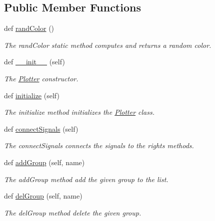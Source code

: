 \subsection*{Public Member Functions}
\begin{DoxyCompactItemize}
\item 
def \hyperlink{classDQN-Deepmind-NIPS-2013_1_1Plotter_1_1Plotter_a781363a311a4b659f454b9f10a930fe5}{rand\+Color} ()
\begin{DoxyCompactList}\small\item\em The rand\+Color static method computes and returns a random color. \end{DoxyCompactList}\item 
def \hyperlink{classDQN-Deepmind-NIPS-2013_1_1Plotter_1_1Plotter_a667c98c2620e83ae62d8cd9a9ba4e94c}{\+\_\+\+\_\+init\+\_\+\+\_\+} (self)
\begin{DoxyCompactList}\small\item\em The \hyperlink{classDQN-Deepmind-NIPS-2013_1_1Plotter_1_1Plotter}{Plotter} constructor. \end{DoxyCompactList}\item 
def \hyperlink{classDQN-Deepmind-NIPS-2013_1_1Plotter_1_1Plotter_a8e1227cf851a49de8362084fe06846fa}{initialize} (self)
\begin{DoxyCompactList}\small\item\em The initialize method initializes the \hyperlink{classDQN-Deepmind-NIPS-2013_1_1Plotter_1_1Plotter}{Plotter} class. \end{DoxyCompactList}\item 
def \hyperlink{classDQN-Deepmind-NIPS-2013_1_1Plotter_1_1Plotter_a5369f165b720b7867e35cb1394d1a4f7}{connect\+Signals} (self)
\begin{DoxyCompactList}\small\item\em The connect\+Signals connects the signals to the rights methods. \end{DoxyCompactList}\item 
def \hyperlink{classDQN-Deepmind-NIPS-2013_1_1Plotter_1_1Plotter_a289c6002e292a7c4b60e335bddbd9ae0}{add\+Group} (self, name)
\begin{DoxyCompactList}\small\item\em The add\+Group method add the given group to the list. \end{DoxyCompactList}\item 
def \hyperlink{classDQN-Deepmind-NIPS-2013_1_1Plotter_1_1Plotter_ac7b49118b884b5203067c4f976cc6158}{del\+Group} (self, name)
\begin{DoxyCompactList}\small\item\em The del\+Group method delete the given group. \end{DoxyCompactList}\item 

\end{DoxyCompactItemize}
